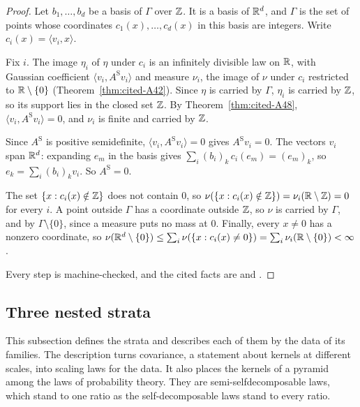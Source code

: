 \begin{proof}
Let $b_1, \dots, b_d$ be a basis of $\Gamma$ over $\mathbb{Z}$. It is a basis of $\mathbb{R}^d$, and $\Gamma$ is the
set of points whose coordinates $c_1(x), \dots, c_d(x)$ in this basis are integers. Write
$c_i(x) = \langle v_i, x\rangle$.

Fix $i$. The image $\eta_i$ of $\eta$ under $c_i$ is an infinitely divisible law on $\mathbb{R}$, with
Gaussian coefficient $\langle v_i, A^{\mathrm S}v_i\rangle$ and \Levy{} measure $\nu_i$, the image of $\nu$
under $c_i$ restricted to $\mathbb{R} \setminus \{0\}$ (Theorem~\ref{thm:cited-A42}). Since $\eta$ is
carried by $\Gamma$, $\eta_i$ is carried by $\mathbb{Z}$, so its support lies in the closed set $\mathbb{Z}$. By
Theorem~\ref{thm:cited-A48}, $\langle v_i, A^{\mathrm S}v_i\rangle = 0$, and $\nu_i$ is finite and carried
by $\mathbb{Z}$.

Since $A^{\mathrm S}$ is positive semidefinite, $\langle v_i, A^{\mathrm S}v_i\rangle = 0$ gives $A^{\mathrm S}v_i = 0$. The vectors
$v_i$ span $\mathbb{R}^d$: expanding $e_m$ in the basis gives $\sum_i(b_i)_k\,c_i(e_m) = (e_m)_k$, so
$e_k = \sum_i(b_i)_kv_i$. So $A^{\mathrm S} = 0$.

The set $\{x : c_i(x) \notin \mathbb{Z}\}$ does not contain $0$, so
$\nu(\{x : c_i(x) \notin \mathbb{Z}\}) = \nu_i(\mathbb{R} \setminus \mathbb{Z}) = 0$ for every $i$. A point outside
$\Gamma$ has a coordinate outside $\mathbb{Z}$, so $\nu$ is carried by $\Gamma$, and by
$\Gamma \setminus \{0\}$, since a \Levy{} measure puts no mass at $0$. Finally, every $x \ne 0$ has
a nonzero coordinate, so
$\nu(\mathbb{R}^d \setminus \{0\}) \le \sum_i\nu(\{x : c_i(x) \ne 0\}) = \sum_i\nu_i(\mathbb{R} \setminus \{0\}) < \infty$.

Every step is machine-checked, and the cited facts are  and .
\end{proof}

\subsection{Three nested strata}
\label{sec:pyramid-strata}

This subsection defines the strata and describes each of them by the \Levy{} data of its
families. The description turns covariance, a statement about kernels at different scales, into
scaling laws for the data. It also places the kernels of a pyramid among the laws of probability
theory. They are semi-selfdecomposable laws, which stand to one ratio as the self-decomposable laws
stand to every ratio.

